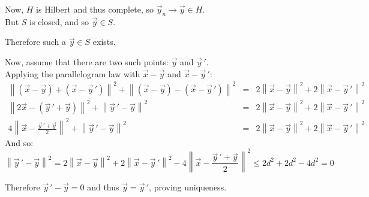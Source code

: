 \documentclass[letterpaper,12pt,fleqn]{article}
\newcommand{\vx}{\vec{x}}
\newcommand{\vy}{\vec{y}}
\newcommand{\vyp}{\vec{y}\,'}
\newcommand{\norm}[1]{\left\|#1\right\|}
\begin{document}
\begin{theproof}
  Now, $H$ is Hilbert and thus complete, so $\vy_n\to\vy\in H$. \\
  But $S$ is closed, and so $\vy\in S$.

  Therefore such a $\vy\in S$ exists.

  Now, assume that there are two such points: $\vy$ and $\vyp$. \\
  Applying the parallelogram law with $\vx-\vy$ and $\vx-\vyp$:
  \begin{eqnarray*}
    \norm{(\vx-\vy)+(\vx-\vyp)}^2+\norm{(\vx-\vy)-(\vx-\vyp)}^2 &=&
    2\norm{\vx-\vy}^2+2\norm{\vx-\vyp}^2 \\
    \norm{2\vx-(\vyp+\vy)}^2+\norm{\vyp-\vy}^2 &=&
    2\norm{\vx-\vy}^2+2\norm{\vx-\vyp}^2 \\
    4\norm{\vx-\frac{\vyp+\vy}{2}}^2+\norm{\vyp-\vy}^2 &=&
    2\norm{\vx-\vy}^2+2\norm{\vx-\vyp}^2
  \end{eqnarray*}
  And so:
  \[\norm{\vyp-\vy}^2=2\norm{\vx-\vy}^2+2\norm{\vx-\vyp}^2-
  4\norm{\vx-\frac{\vyp+\vy}{2}}^2\le2d^2+2d^2-4d^2=0\]

  Therefore $\vyp-\vy=0$ and thus $\vy=\vyp$, proving uniqueness.
\end{theproof}
\end{document}

